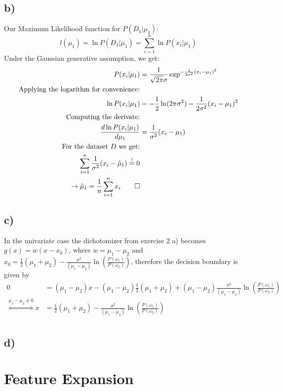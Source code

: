 \documentclass[paper=a4,fontsize=10pt,DIV11,BCOR10mm]{scrartcl}
\begin{document}
\subsection*{b)}
	Our Maximum Likelihood function for $P(D_1|\mu_1)$:
	\[
	l(\mu_1) = \ln P(D_1|\mu_1) = \sum_{i=1}^n \ln P(x_i|\mu_1)
	\]
	Under the Gaussian generative assumption, we get:
	\begin{align*}
		P(x_i|\mu_1) &= \frac{1}{\sqrt{2\pi}\sigma}\exp^{-\frac{1}{2\sigma^2}(x_i-\mu_1)^2}\\
	\text{Applying the logarithm for convenience:}&\\
		\ln P(x_i|\mu_1) &=-\frac{1}{2} \ln (2\pi \sigma^2) -\frac{1}{2\sigma^2}(x_i-\mu_1)^2\\
	\text{Computing the derivate:}&\\
		\frac{d \ln P(x_i|\mu_1)}{d \mu_1} &= \frac{1}{\sigma^2}(x_i- \mu_1)\\
	\text{For the dataset $D$ we get:}&\\
	\sum_{i=1}^n \frac{1}{\sigma^2}(x_i- \hat{\mu}_1) \stackrel{!}{=} 0\\
	\rightarrow \hat{\mu}_1=\frac{1}{n} \sum_{i=1}^n x_i \qed
	\end{align*}

\subsection*{c)}
In the univariate case the dichotomizer from exercise 2 a) becomes $g(x)= w(x-x_0)$, where $w=\mu_1-\mu_2$ and $x_0=\frac{1}{2}(\mu_1+\mu_2)-\frac{\sigma^2}{(\mu_1 - \mu_2)}\ln(\frac{P(\omega_1)}{P(\omega_2)})$, therefore the decision boundary is given by 
\begin{align*}
0&=(\mu_1-\mu_2)x - (\mu_1-\mu_2) \frac{1}{2}(\mu_1+\mu_2)+(\mu_1-\mu_2)\frac{\sigma^2}{(\mu_1 - \mu_2)}\ln(\frac{P(\omega_1)}{P(\omega_2)})\\
\stackrel{\mu_1-\mu_2 \neq 0}{\Leftrightarrow} x&=\frac{1}{2}(\mu_1 +\mu_2)-\frac{\sigma^2}{(\mu_1 - \mu_2)}\ln(\frac{P(\omega_1)}{P(\omega_2)})\\
\end{align*}
\subsection*{d)}


\section{Feature Expansion}
\end{document}

